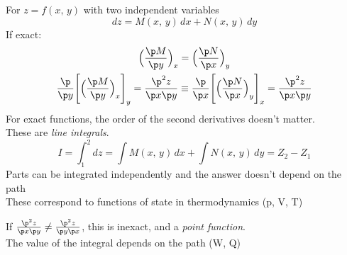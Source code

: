 \documentclass[a4paper, 11pt, normalem]{report}
\begin{document}
For $z = f(x,\,y)$ with two independent variables
\begin{equation*}
    dz = M(x,\,y)\,dx + N(x,\,y)\,dy
\end{equation*}
If exact:
\begin{gather*}
    \Big(\frac{\p M}{\p y} \Big)_x = \Big(\frac{\p N}{\p x} \Big)_y \\
    \frac{\p}{\p y}\Bigg[\Big(\frac{\p M}{\p y} \Big)_x \Bigg]_y = \frac{\p^2 z}{\p x \p y} \equiv \frac{\p}{\p x}\Bigg[\Big(\frac{\p N}{\p x}\Big)_y \Bigg]_x = \frac{\p^2 z}{\p x \p y}
\end{gather*}
For exact functions, the order of the second derivatives doesn't matter. \\
These are \emph{line integrals}.
\begin{equation*}
    I = \int_{1}^{2} dz = \int M(x,\,y)\,dx + \int N(x,\,y)\,dy = Z_2 - Z_1
\end{equation*}
Parts can be integrated independently and the answer doesn't depend on the path \\
These correspond to functions of state in thermodynamics (p, V, T)

If $\frac{\p^2 z}{\p x \p y} \neq \frac{\p^2 z}{\p y \p x}$, this is inexact, and a \emph{point function}. \\
The value of the integral depends on the path (W, Q)
\end{document}
